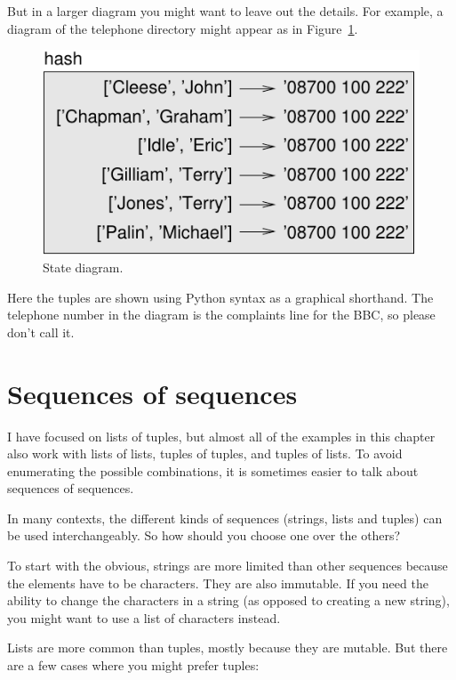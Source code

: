 \documentclass[10pt]{book}
\begin{document}
But in a larger diagram you might want to leave out the
details.  For example, a diagram of the telephone directory might
appear as in Figure~\ref{fig.dict2}.

\begin{figure}
\centerline
{\includegraphics[scale=0.8]{figs/dict2.pdf}}
\caption{State diagram.}
\label{fig.dict2}
\end{figure}

Here the tuples are shown using Python syntax as a graphical
shorthand.  The telephone number in the diagram is the complaints line
for the BBC, so please don't call it.


\section{Sequences of sequences}

I have focused on lists of tuples, but almost all of the examples in
this chapter also work with lists of lists, tuples of tuples, and
tuples of lists.  To avoid enumerating the possible combinations, it
is sometimes easier to talk about sequences of sequences.

In many contexts, the different kinds of sequences (strings, lists and
tuples) can be used interchangeably.  So how should you choose one
over the others?

To start with the obvious, strings are more limited than other
sequences because the elements have to be characters.  They are
also immutable.  If you need the ability to change the characters
in a string (as opposed to creating a new string), you might
want to use a list of characters instead.

Lists are more common than tuples, mostly because they are mutable.
But there are a few cases where you might prefer tuples:
\end{document}
